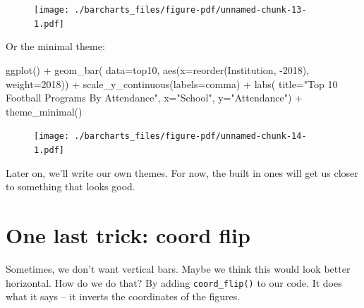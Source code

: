\documentclass[
  letterpaper,
  DIV=11,
  numbers=noendperiod]{scrreprt}
\newenvironment{Shaded}{\begin{snugshade}}{\end{snugshade}}
\newcommand{\AttributeTok}[1]{\textcolor[rgb]{0.40,0.45,0.13}{#1}}
\newcommand{\FunctionTok}[1]{\textcolor[rgb]{0.28,0.35,0.67}{#1}}
\newcommand{\NormalTok}[1]{\textcolor[rgb]{0.00,0.23,0.31}{#1}}
\newcommand{\SpecialCharTok}[1]{\textcolor[rgb]{0.37,0.37,0.37}{#1}}
\newcommand{\StringTok}[1]{\textcolor[rgb]{0.13,0.47,0.30}{#1}}
\begin{document}
\begin{figure}[H]

{\centering \texttt{[image: ./barcharts\_files/figure-pdf/unnamed-chunk-13-1.pdf]}

}

\end{figure}

Or the minimal theme:

\begin{Shaded}
\begin{Highlighting}[]
\FunctionTok{ggplot}\NormalTok{() }\SpecialCharTok{+} 
  \FunctionTok{geom\_bar}\NormalTok{(}
    \AttributeTok{data=}\NormalTok{top10, }
    \FunctionTok{aes}\NormalTok{(}\AttributeTok{x=}\FunctionTok{reorder}\NormalTok{(Institution, }\SpecialCharTok{{-}}\StringTok{\textasciigrave{}}\AttributeTok{2018}\StringTok{\textasciigrave{}}\NormalTok{),}
        \AttributeTok{weight=}\StringTok{\textasciigrave{}}\AttributeTok{2018}\StringTok{\textasciigrave{}}\NormalTok{)) }\SpecialCharTok{+} 
  \FunctionTok{scale\_y\_continuous}\NormalTok{(}\AttributeTok{labels=}\NormalTok{comma) }\SpecialCharTok{+} 
  \FunctionTok{labs}\NormalTok{(}
    \AttributeTok{title=}\StringTok{"Top 10 Football Programs By Attendance"}\NormalTok{, }
    \AttributeTok{x=}\StringTok{"School"}\NormalTok{, }
    \AttributeTok{y=}\StringTok{"Attendance"}\NormalTok{) }\SpecialCharTok{+} 
  \FunctionTok{theme\_minimal}\NormalTok{()}
\end{Highlighting}
\end{Shaded}

\begin{figure}[H]

{\centering \texttt{[image: ./barcharts\_files/figure-pdf/unnamed-chunk-14-1.pdf]}

}

\end{figure}

Later on, we'll write our own themes. For now, the built in ones will
get us closer to something that looks good.

\hypertarget{one-last-trick-coord-flip}{%
\section{One last trick: coord flip}\label{one-last-trick-coord-flip}}

Sometimes, we don't want vertical bars. Maybe we think this would look
better horizontal. How do we do that? By adding \texttt{coord\_flip()}
to our code. It does what it says -- it inverts the coordinates of the
figures.
\end{document}
